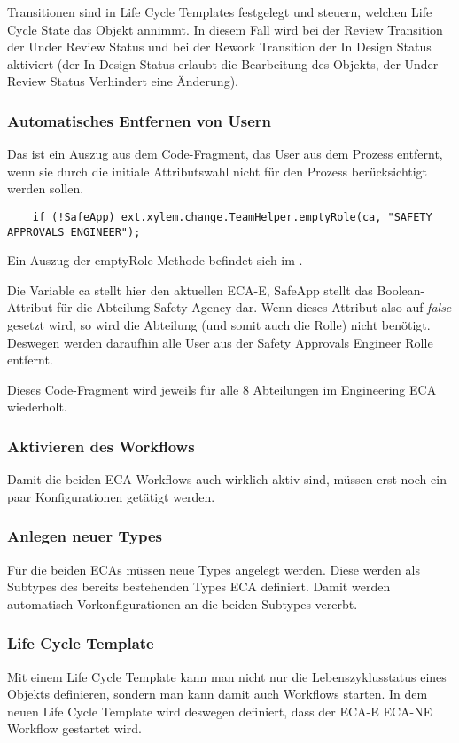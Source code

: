Transitionen sind in Life Cycle Templates festgelegt und steuern, welchen Life Cycle State das Objekt annimmt.
In diesem Fall wird bei der Review Transition der \glqq Under Review\grqq{} Status und bei der Rework Transition der \glqq In Design\grqq{} Status aktiviert (der In Design Status erlaubt die Bearbeitung des Objekts, der Under Review Status Verhindert eine Änderung).

\subsubsection*{Automatisches Entfernen von Usern}
Das ist ein Auszug aus dem Code-Fragment, das User aus dem Prozess entfernt, wenn sie durch die initiale Attributswahl nicht für den Prozess berücksichtigt werden sollen.
\begin{lstlisting}
    if (!SafeApp) ext.xylem.change.TeamHelper.emptyRole(ca, "SAFETY APPROVALS ENGINEER");
\end{lstlisting}

Ein Auszug der emptyRole Methode befindet sich im .

Die Variable \glqq ca\grqq{} stellt hier den aktuellen ECA-E, \glqq SafeApp\grqq{} stellt das Boolean-Attribut für die Abteilung \glqq Safety Agency\grqq{} dar.
Wenn dieses Attribut also auf \textit{false} gesetzt wird, so wird die Abteilung (und somit auch die Rolle) nicht benötigt.
Deswegen werden daraufhin alle User aus der \glqq Safety Approvals Engineer\grqq{} Rolle entfernt.

Dieses Code-Fragment wird jeweils für alle 8 Abteilungen im Engineering ECA wiederholt.

\subsubsection{Aktivieren des Workflows}
Damit die beiden ECA Workflows auch wirklich aktiv sind, müssen erst noch ein paar Konfigurationen getätigt werden.

\subsubsection*{Anlegen neuer Types}
Für die beiden ECAs müssen neue Types angelegt werden.
Diese werden als Subtypes des bereits bestehenden Types ECA definiert.
Damit werden automatisch Vorkonfigurationen an die beiden Subtypes vererbt.

\subsubsection*{Life Cycle Template}
Mit einem Life Cycle Template kann man nicht nur die Lebenszyklusstatus eines Objekts definieren, sondern man kann damit auch Workflows starten.
In dem neuen Life Cycle Template wird deswegen definiert, dass der ECA-E \bzw ECA-NE Workflow gestartet wird.

